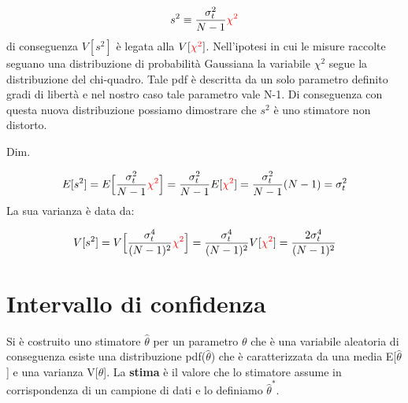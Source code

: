 \documentclass[11pt,a4paper]{book}
\begin{document}
\begin{equation*}
	s^2 \equiv \dfrac{\sigma_t^2}{N-1}\textcolor{red}{\chi^2}
\end{equation*}
\newline
di conseguenza $V[s^2]$ \`{e} legata alla $V[\textcolor{red}{\chi^2}]$. Nell'ipotesi in cui le misure raccolte seguano una distribuzione di probabilit\`{a} Gaussiana la variabile $\chi^2$ segue la distribuzione del chi-quadro. Tale pdf \`{e} descritta da un solo parametro definito gradi di libert\`{a} e nel nostro caso tale parametro vale N-1. 
\newline
Di conseguenza con questa nuova distribuzione possiamo dimostrare che $s^2$ \`{e} uno stimatore non distorto.\newline

Dim.

\begin{equation*}
	E[s^2] = E \Big[\dfrac{\sigma_t^2}{N-1}\textcolor{red}{\chi^2} \Big] = \dfrac{\sigma_t^2}{N-1}E[\textcolor{red}{\chi^2}] = \dfrac{\sigma_t^2}{N-1}(N-1) = \sigma_t^2
\end{equation*}
\newline
La sua varianza \`{e} data da:

\begin{equation*}
	V[s^2] = V \Big [ \dfrac{\sigma_t^4}{(N-1)^2}\textcolor{red}{\chi^2} \Big] = \dfrac{\sigma_t^4}{(N-1)^2}V[\textcolor{red}{\chi^2}] = \dfrac{2\sigma_t^4}{(N-1)^2} 
	\end{equation*}

\section{Intervallo di confidenza}

Si \`{e} costruito uno stimatore $\hat{\theta}$ per un parametro $\theta$ che \`{e} una variabile aleatoria di conseguenza esiste una distribuzione pdf($\hat{\theta}$) che \`{e} caratterizzata da una media E[$\hat{\theta}$] e una varianza V[$\hat{\theta}$]. La \textbf{stima} \`{e} il valore che lo stimatore assume in corrispondenza di un campione di dati e lo definiamo $\hat{\theta}^*$.\newline
\end{document}

